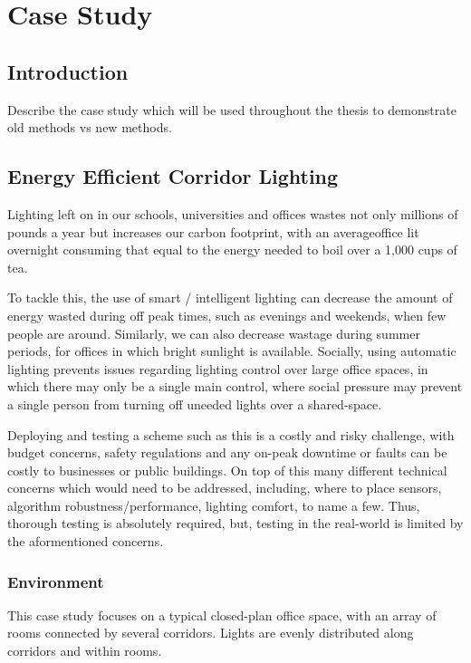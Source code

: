 \chapter{Case Study}
\label{chap:Case Study}
\section{Introduction}
\label{sec:Introduction}
Describe the case study which will be used throughout the thesis to demonstrate old methods vs new methods.

\section{Energy Efficient Corridor Lighting}
Lighting left on in our schools, universities and offices wastes not only millions of pounds a year but increases our carbon footprint, with an average\footnotemark office lit overnight consuming that equal to the energy needed to boil over a 1,000 cups of tea\cite{cambridgeEnergyWaste,carbonTrustEnergyWaste}. 

To tackle this, the use of smart / intelligent lighting can decrease the amount of energy wasted during off peak times, such as evenings and weekends, when few people are around. Similarly, we can also decrease wastage during summer periods, for offices in which bright sunlight is available. Socially, using automatic lighting prevents issues regarding lighting control over large office spaces, in which there may only be a single main control, where social pressure may prevent a single person from turning off uneeded lights over a shared-space.

Deploying and testing a scheme such as this is a costly and risky challenge, with budget concerns, safety regulations and any on-peak downtime or faults can be costly to businesses or public buildings. On top of this many different technical concerns which would need to be addressed, including, where to place sensors, algorithm robustness/performance, lighting comfort, to name a few. Thus, thorough testing is absolutely required, but, testing in the real-world is limited by the aformentioned concerns. 



\subsection{Environment}
\label{subsec:Environment}
This case study focuses on a typical closed-plan office space, with an array of rooms connected by several corridors. Lights are evenly distributed along corridors and within rooms. 

